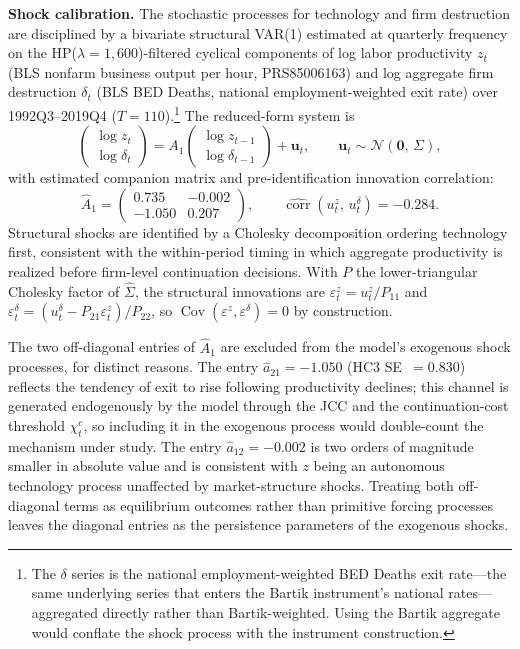 \documentclass[authoryear, review, 12pt]{elsarticle}
\begin{document}
	\medskip\noindent\textbf{Shock calibration.}
	The stochastic processes for technology and firm destruction are
	disciplined by a bivariate structural VAR(1) estimated at quarterly
	frequency on the HP($\lambda=1{,}600$)-filtered cyclical components
	of log labor productivity $z_t$ (BLS nonfarm business output per
	hour, PRS85006163) and log aggregate firm destruction $\delta_t$
	(BLS BED Deaths, national employment-weighted exit rate) over
	1992Q3--2019Q4 ($T=110$).\footnote{The $\delta$ series is the
	national employment-weighted BED Deaths exit rate---the same
	underlying series that enters the Bartik instrument's national
	rates---aggregated directly rather than Bartik-weighted. Using the
	Bartik aggregate would conflate the shock process with the
	instrument construction.}
	The reduced-form system is
	\begin{equation}
		\begin{pmatrix}\log z_t \\ \log \delta_t\end{pmatrix}
		= A_1
		\begin{pmatrix}\log z_{t-1} \\ \log \delta_{t-1}\end{pmatrix}
		+ \mathbf{u}_t, \qquad
		\mathbf{u}_t \sim \mathcal{N}(\mathbf{0},\,\Sigma),
		\label{eq:var_zd}
	\end{equation}
	with estimated companion matrix and pre-identification innovation
	correlation:
	\begin{equation}
		\hat{A}_1 =
		\begin{pmatrix} 0.735 & -0.002 \\ -1.050 & 0.207 \end{pmatrix},
		\qquad
		\widehat{\operatorname{corr}}(u^z_t,\,u^\delta_t) = -0.284.
		\label{eq:var_zd_coefs}
	\end{equation}
	Structural shocks are identified by a Cholesky decomposition
	ordering technology first, consistent with the within-period timing
	in which aggregate productivity is realized before firm-level
	continuation decisions.
	With $P$ the lower-triangular Cholesky factor of $\hat{\Sigma}$,
	the structural innovations are
	$\varepsilon^z_t = u^z_t/P_{11}$ and
	$\varepsilon^\delta_t = (u^\delta_t - P_{21}\varepsilon^z_t)/P_{22}$,
	so $\operatorname{Cov}(\varepsilon^z,\varepsilon^\delta)=0$ by
	construction.

	The two off-diagonal entries of $\hat{A}_1$ are excluded from the
	model's exogenous shock processes, for distinct reasons.
	The entry $\hat{a}_{21}=-1.050$ (HC3 SE~$=0.830$) reflects the
	tendency of exit to rise following productivity declines; this
	channel is generated endogenously by the model through the JCC and
	the continuation-cost threshold $\chi^c_t$, so including it in the
	exogenous process would double-count the mechanism under study.
	The entry $\hat{a}_{12}=-0.002$ is two orders of magnitude smaller
	in absolute value and is consistent with $z$ being an autonomous
	technology process unaffected by market-structure shocks.
	Treating both off-diagonal terms as equilibrium outcomes rather than
	primitive forcing processes leaves the diagonal entries as the
	persistence parameters of the exogenous shocks.
\end{document}
